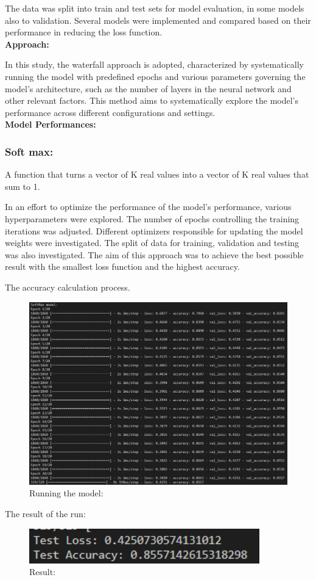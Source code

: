 \documentclass{article}
\begin{document}
The data was split into train and test sets for model evaluation, in some models also to validation. Several models were implemented and compared based on their performance in reducing the loss function.\\
\textbf{Approach:}

In this study, the waterfall approach is adopted, characterized by systematically running the model with predefined epochs and various parameters governing the model's architecture, such as the number of layers in the neural network and other relevant factors. This method aims to systematically explore the model's performance across different configurations and settings.\\
\textbf{Model Performances:}\\

\subsubsection{Soft max:}
A function that turns a vector of K real values into a vector of K real values that sum to 1.

In an effort to optimize the performance of the model's performance, various hyperparameters were explored.
The number of epochs controlling the training iterations was adjusted.
Different optimizers responsible for updating the model weights were investigated. The split of data for training, validation and testing was also investigated.
The aim of this approach was to achieve the best possible result with the smallest loss function and the highest accuracy.

The accuracy calculation process.
\begin{figure}[H]
    \caption{Running the model:}
    \centering
    \includegraphics[width=15cm]{imgFolder/RunningSoftMax.png}
\end{figure}
The result of the run:
\begin{figure}[H]
    \caption{Result:}
    \centering
    \includegraphics[width=10cm]{imgFolder/softMaxResult.png}
\end{figure}
\end{document}
